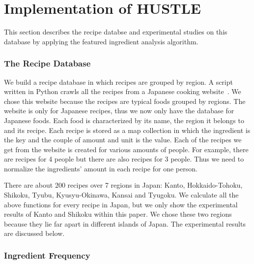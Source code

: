 \chapter{Implementation of HUSTLE}\label{chap:implementation}
This section describes the recipe databse and experimental studies on this database by applying the featured ingredient analysis algorithm.  

\subsection{The Recipe Database}

We build a recipe database in which recipes are grouped by region. A script written in Python crawls all the recipes from a Japanese cooking website~\cite{web:recipe}. We chose this website because the recipes are typical foods grouped by regions. The website is only for Japanese recipes, thus we now only have the database for Japanese foods. Each food is characterized by its name, the region it belongs to and its recipe. Each recipe is stored as a map collection in which the ingredient is the key and the couple of amount and unit is the value. Each of the recipes we get from the website is created for various amounts of people. For example, there are recipes for 4 people but there are also recipes for 3 people. Thus we need to normalize the ingredients' amount in each recipe for one person.

\par There are about 200 recipes over 7 regions in Japan: Kanto, Hokkaido-Tohoku, Shikoku, Tyubu, Kyusyu-Okinawa, Kansai and Tyugoku. We calculate all the above functions for every recipe in Japan, but we only show the experimental results of Kanto and Shikoku within this paper. We chose these two regions because they lie far apart in different islands of Japan. The experimental results are discussed below. 

\subsection{Ingredient Frequency}

